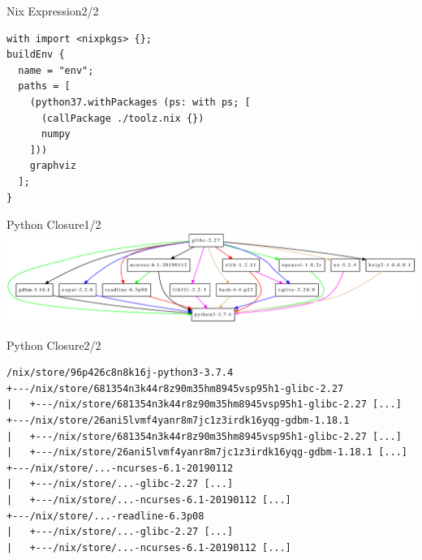 \documentclass[10pt,aspectratio=169]{beamer}
\begin{document}

\begin{frame}[fragile]{Nix Expression\hfill2/2}
  \begin{verbatim}
with import <nixpkgs> {};
buildEnv {
  name = "env";
  paths = [
    (python37.withPackages (ps: with ps; [
      (callPackage ./toolz.nix {})
      numpy
    ]))
    graphviz
  ];
}
  \end{verbatim}
\end{frame}


\begin{frame}{Python Closure\hfill1/2}
\vspace{0.71cm}
\includegraphics[trim=300 0 0 0,height=0.72\paperheight]{images/python-closure.eps}
\end{frame}


\begin{frame}[fragile]{Python Closure\hfill2/2}
  \begin{verbatim}
/nix/store/96p426c8n8k16j-python3-3.7.4
+---/nix/store/681354n3k44r8z90m35hm8945vsp95h1-glibc-2.27
|   +---/nix/store/681354n3k44r8z90m35hm8945vsp95h1-glibc-2.27 [...]
+---/nix/store/26ani5lvmf4yanr8m7jc1z3irdk16yqg-gdbm-1.18.1
|   +---/nix/store/681354n3k44r8z90m35hm8945vsp95h1-glibc-2.27 [...]
|   +---/nix/store/26ani5lvmf4yanr8m7jc1z3irdk16yqg-gdbm-1.18.1 [...]
+---/nix/store/...-ncurses-6.1-20190112
|   +---/nix/store/...-glibc-2.27 [...]
|   +---/nix/store/...-ncurses-6.1-20190112 [...]
+---/nix/store/...-readline-6.3p08
|   +---/nix/store/...-glibc-2.27 [...]
|   +---/nix/store/...-ncurses-6.1-20190112 [...]
  \end{verbatim}
\end{frame}

\end{document}
